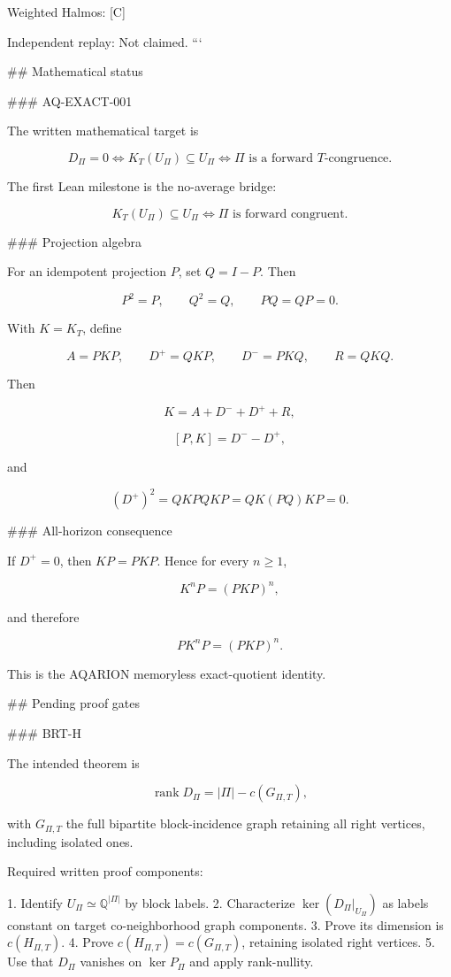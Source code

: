 Weighted Halmos:
[C]

Independent replay:
Not claimed.
```

## Mathematical status

### AQ-EXACT-001

The written mathematical target is

\[
D_\Pi=0
\Longleftrightarrow
K_T(U_\Pi)\subseteq U_\Pi
\Longleftrightarrow
\Pi\text{ is a forward }T\text{-congruence}.
\]

The first Lean milestone is the no-average bridge:

\[
K_T(U_\Pi)\subseteq U_\Pi
\Longleftrightarrow
\Pi\text{ is forward congruent}.
\]

### Projection algebra

For an idempotent projection \(P\), set \(Q=I-P\). Then

\[
P^2=P,\qquad Q^2=Q,\qquad PQ=QP=0.
\]

With \(K=K_T\), define

\[
A=PKP,\qquad
D^+=QKP,\qquad
D^-=PKQ,\qquad
R=QKQ.
\]

Then

\[
K=A+D^-+D^++R,
\]

\[
[P,K]=D^- - D^+,
\]

and

\[
(D^+)^2=QKPQKP=QK(PQ)KP=0.
\]

### All-horizon consequence

If \(D^+=0\), then \(KP=PKP\). Hence for every \(n\ge1\),

\[
K^nP=(PKP)^n,
\]

and therefore

\[
\boxed{
PK^nP=(PKP)^n.
}
\]

This is the AQARION memoryless exact-quotient identity.

## Pending proof gates

### BRT-H

The intended theorem is

\[
\operatorname{rank}D_\Pi
=
|\Pi|-c(G_{\Pi,T}),
\]

with \(G_{\Pi,T}\) the full bipartite block-incidence graph retaining all
right vertices, including isolated ones.

Required written proof components:

1. Identify \(U_\Pi\simeq\mathbb Q^{|\Pi|}\) by block labels.
2. Characterize \(\ker(D_\Pi|_{U_\Pi})\) as labels constant on target
   co-neighborhood graph components.
3. Prove its dimension is \(c(H_{\Pi,T})\).
4. Prove \(c(H_{\Pi,T})=c(G_{\Pi,T})\), retaining isolated right vertices.
5. Use that \(D_\Pi\) vanishes on \(\ker P_\Pi\) and apply rank-nullity.

